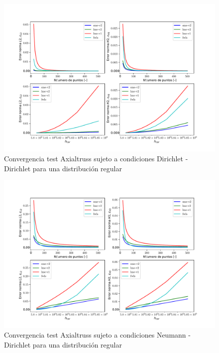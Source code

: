 \begin{figure}
    \centering
    \includegraphics[width=1\textwidth]{./Imagenes/06/comparacion_shp_regular/Axialtruss_regular_type-2_caso-1_direct_dgesv-lapack-blas_sme-v2_lme-v2_lme-v1_fwls.pdf}
    \caption{Convergencia test Axialtruss sujeto a condiciones Dirichlet - Dirichlet para una distribución regular} \label{fig:Axialtruss_caso-1_conv}
\end{figure}
\begin{figure}
    \centering
    \includegraphics[width=1\textwidth]{./Imagenes/06/comparacion_shp_regular/Axialtruss_regular_type-2_caso-2_direct_dgesv-lapack-blas_sme-v2_lme-v2_lme-v1_fwls.pdf}
    \caption{Convergencia test Axialtruss sujeto a condiciones Neumann - Dirichlet para una distribución regular} \label{fig:Axialtruss_caso-2_conv}
\end{figure}
